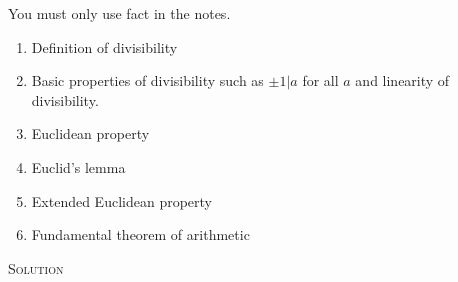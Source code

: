 You must only use fact in the notes.
\begin{enumerate}[nosep]
\item Definition of divisibility
\item Basic properties of divisibility such as $\pm 1 | a$ for all $a$
and linearity of divisibility.
\item Euclidean property
\item Euclid's lemma
\item Extended Euclidean property
\item Fundamental theorem of arithmetic
\end{enumerate}

\textsc{Solution}





